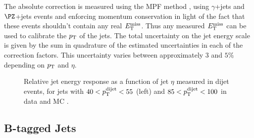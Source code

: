 The absolute correction is measured
using the \ac{MPF} method \cite{Abe:1992sj}, using $\gamma$+jets and $\PZ$+jets
events and enforcing momentum conservation in light of the fact that these
events shouldn't contain any real $E_{\mathrm{T}}^{\text{miss}}$. Thus any measured $E_{\mathrm{T}}^{\text{miss}}$ can be used to
calibrate the $p_{\mathrm{T}}$ of the jets. The total uncertainty on the jet energy scale
is given by the sum in quadrature of the estimated uncertainties in each of the
correction factors. This uncertainty varies between approximately $3$ and $5\%$
depending on $p_{\mathrm{T}}$ and $\eta$. 

\begin{figure}
\begin{center}

\end{center}
\caption{
Relative jet energy response as a function of jet $\eta$ measured in dijet
events, for jets with $40 < p_{\mathrm{T}}^{\text{dijet}} < 55$ (left) and 
$85 < p_{\mathrm{T}}^{\text{dijet}} < 100$ in data and MC \cite{CMS-JME-10-011}.       
}
\label{fig:jesresponse}
\end{figure}

\subsection{B-tagged Jets}
\label{sec:btag}

